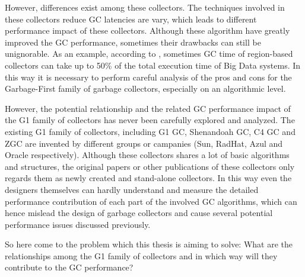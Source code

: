 However, differences exist among these collectors.
The techniques involved in these collectors reduce GC latencies are vary, which leads to different
performance impact of these collectors. Although these algorithm have greatly
improved the GC performance, sometimes their drawbacks can still be unignorable.
As an example, according to \cite{briandemsky2015speculative}, sometimes GC time of region-based collectors
can take up to 50\% of the total execution time of Big Data systems.
In this way it is necessary to perform careful analysis of the pros and cons for the 
Garbage-First family of garbage collectors, especially on an algorithmic level.

However, the potential relationship and the related GC performance impact of
the G1 family of collectors has never been carefully explored and analyzed.
The existing G1 family of collectors, including
G1 GC, Shenandoah GC, C4 GC and ZGC are invented by different groups or campanies (Sun, RadHat, Azul and Oracle respectively).
Although these collectors shares a lot of basic algorithms and structures,
the original papers or other publications of these collectors only regards them as
newly created and stand-alone collectors.
In this way even the designers themselves can hardly understand and measure the detailed performance
contribution of each part of the involved GC algorithms, which can hence mislead the design
of garbage collectors and cause several potential performance issues discussed previously.

So here come to the problem which this thesis is aiming to solve: What are the relationships
among the G1 family of collectors and in which way will they contribute to the GC performance?





